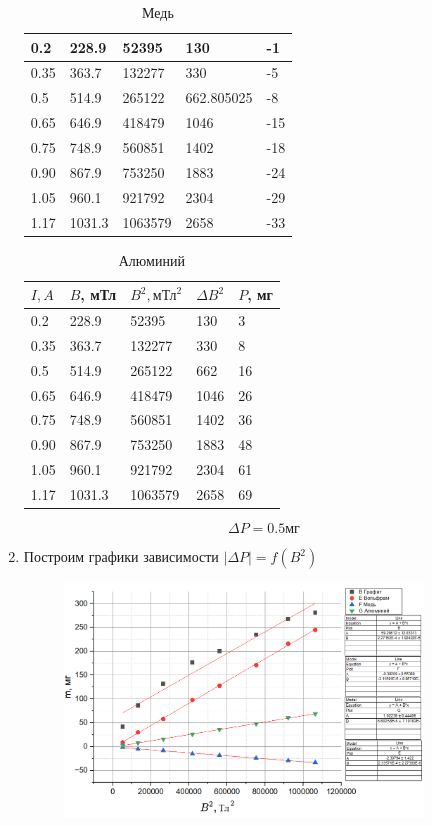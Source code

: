 \documentclass[12pt,a4paper]{article}
\begin{document}
\begin{enumerate}
\begin{table}[h!]
\begin{tabular}{|l|l|l|l|l|}
        0.2 & 228.9 & 52395 & 130 & -1 \\ \hline
        0.35 & 363.7 & 132277 & 330 & -5 \\ \hline
        0.5 & 514.9 & 265122 & 662.805025 & -8 \\ \hline
        0.65 & 646.9 & 418479 & 1046 & -15 \\ \hline
        0.75 & 748.9 & 560851 & 1402 & -18 \\ \hline
        0.90 & 867.9 & 753250 & 1883 & -24 \\ \hline
        1.05 & 960.1 & 921792 & 2304 & -29 \\ \hline
        1.17 & 1031.3 & 1063579 & 2658 & -33 \\ \hline
    \end{tabular}
	\caption{Медь}
\end{table}
\begin{table}[h!]
    \centering
    \begin{tabular}{|l|l|l|l|l|}
    \hline
        $I, A$ & $B$, мТл & $B^2, \text{мТл}^2$ & $\Delta B^2$ & $P$, мг \\ \hline
        0.2 & 228.9 & 52395 & 130 & 3 \\ \hline
        0.35 & 363.7 & 132277 & 330 & 8 \\ \hline
        0.5 & 514.9 & 265122 & 662 & 16 \\ \hline
        0.65 & 646.9 & 418479 & 1046 & 26 \\ \hline
        0.75 & 748.9 & 560851 & 1402 & 36 \\ \hline
        0.90 & 867.9 & 753250 & 1883 & 48 \\ \hline
        1.05 & 960.1 & 921792 & 2304 & 61 \\ \hline
        1.17 & 1031.3 & 1063579 & 2658 & 69 \\ \hline
    \end{tabular}
	\caption{Алюминий}
\end{table}
\[
\Delta P = 0.5 \text{мг}
\]
	\item Построим графики зависимости $|\Delta P| = f(B^2)$
	\begin{figure}[h!]
		\begin{center}
			\includegraphics[width = 0.9\textwidth]{graph.png}
			

\end{center}
\end{figure}
\end{enumerate}
\end{document}
